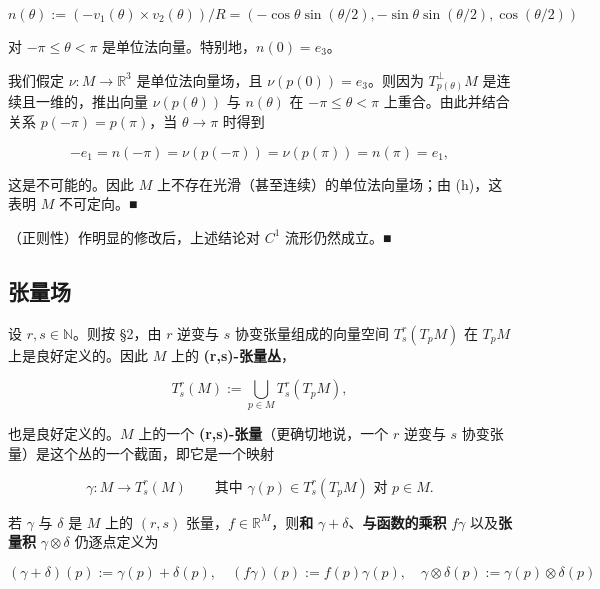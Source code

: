 \begin{example}
\[
n(\theta) := (-v_1(\theta) \times v_2(\theta))/R = (-\cos\theta\sin(\theta/2), -\sin\theta\sin(\theta/2), \cos(\theta/2))
\]

对 $ -\pi \le \theta < \pi $ 是单位法向量。特别地，$ n(0) = e_3 $。

我们假定 $ \nu: M \to \mathbb{R}^{3} $ 是单位法向量场，且 $ \nu(p(0)) = e_3 $。则因为 $ T_{p(\theta)}^{\perp}M $ 是连续且一维的，推出向量 $ \nu(p(\theta)) $ 与 $ n(\theta) $ 在 $ -\pi \le \theta < \pi $ 上重合。由此并结合关系 $ p(-\pi) = p(\pi) $，当 $ \theta \to \pi $ 时得到

\[
-e_1 = n(-\pi) = \nu(p(-\pi)) = \nu(p(\pi)) = n(\pi) = e_1 ,
\]

这是不可能的。因此 $ M $ 上不存在光滑（甚至连续）的单位法向量场；由 (h)，这表明 $ M $ 不可定向。\nobreak\hspace{0.35em}■

\begin{items}
\item[（j）]

（正则性）作明显的修改后，上述结论对 $ C^{1} $ 流形仍然成立。\nobreak\hspace{0.35em}■

\end{items}

\end{example}

\subsection*{张量场}

设 $ r, s \in \mathbb{N} $。则按 §2，由 $ r $ 逆变与 $ s $ 协变张量组成的向量空间 $ T_{s}^{r}(T_{p}M) $ 在 $ T_{p}M $ 上是良好定义的。因此 $ M $ 上的 \textbf{(r,s)-张量丛}，

\[
T_{s}^{r}(M) := \bigcup_{p \in M} T_{s}^{r}(T_{p}M) ,
\]

也是良好定义的。$ M $ 上的一个 \textbf{(r,s)-张量}（更确切地说，一个 $ r $ 逆变与 $ s $ 协变张量）是这个丛的一个截面，即它是一个映射

\[
\gamma: M \to T_{s}^{r}(M) \qquad \text{其中 } \gamma(p) \in T_{s}^{r}(T_{p}M) \text{ 对 } p \in M .
\]

若 $ \gamma $ 与 $ \delta $ 是 $ M $ 上的 $ (r,s) $ 张量，$ f \in \mathbb{R}^{M} $，则\textbf{和} $ \gamma + \delta $、\textbf{与函数的乘积} $ f\gamma $ 以及\textbf{张量积} $ \gamma \otimes \delta $ 仍逐点定义为

\[
(\gamma + \delta)(p) := \gamma(p) + \delta(p) , \quad (f\gamma)(p) := f(p)\gamma(p) , \quad \gamma \otimes \delta(p) := \gamma(p) \otimes \delta(p)
\]


